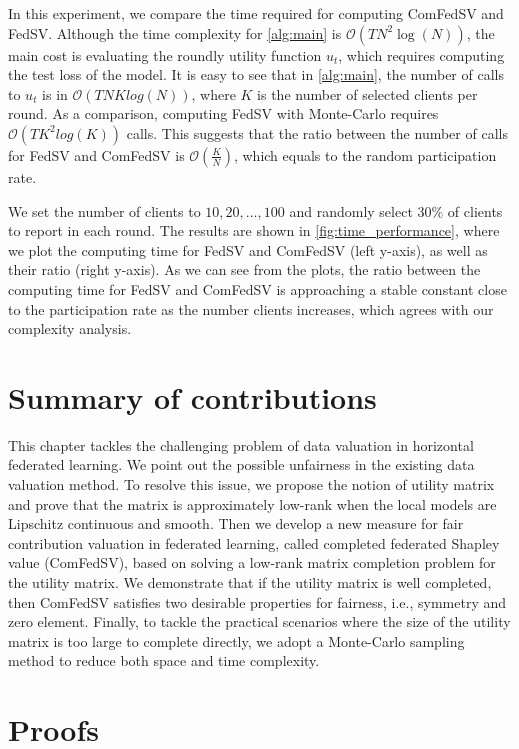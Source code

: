 In this experiment, we compare the time required for computing ComFedSV and FedSV. Although the time complexity for \autoref{alg:main} is $\mathcal{O}(TN^2\log(N))$, the main cost is evaluating the roundly utility function $u_t$, which requires computing the test loss of the model. It is easy to see that in \autoref{alg:main}, the number of calls to $u_t$ is in $\mathcal{O}(TNKlog(N))$, where $K$ is the number of selected clients per round. As a comparison, computing FedSV with Monte-Carlo requires $\mathcal{O}(TK^2log(K))$ calls. This suggests that the ratio between the number of calls for FedSV and ComFedSV is $\mathcal{O}(\frac{K}{N})$, which equals to the random participation rate.

We set the number of clients to $10, 20, \dots, 100$ and randomly select $30\%$ of clients to report in each round. The results are shown in \autoref{fig:time_performance}, where we plot the computing time for FedSV and ComFedSV (left y-axis), as well as their ratio (right y-axis). As we can see from the plots, the ratio between the computing time for FedSV and ComFedSV is approaching a stable constant close to the participation rate as the number clients increases, which agrees with our complexity analysis.

\section{Summary of contributions}

This chapter tackles the challenging problem of data valuation in horizontal federated learning. We point out the possible unfairness in the existing data valuation method. To resolve this issue, we propose the notion of utility matrix and prove that the matrix is approximately low-rank when the local models are Lipschitz continuous and smooth. Then we develop a new measure for fair contribution valuation in federated learning, called completed federated Shapley value (ComFedSV), based on solving a low-rank matrix completion problem for the utility matrix. We demonstrate that if the utility matrix is well completed, then ComFedSV satisfies two desirable properties for fairness, i.e., symmetry and zero element. Finally, to tackle the practical scenarios where the size of the utility matrix is too large to complete directly, we adopt a Monte-Carlo sampling method to reduce both space and time complexity.


\section{Proofs}

